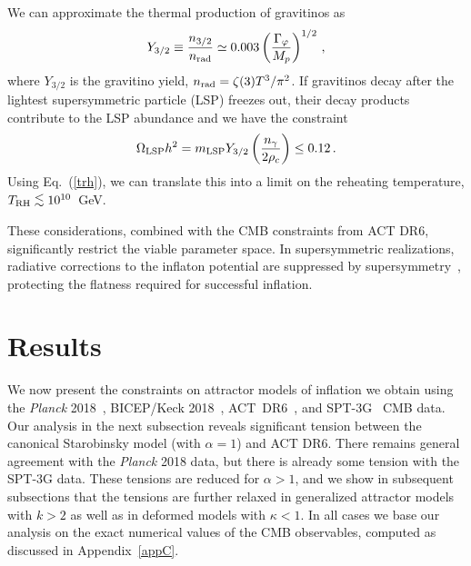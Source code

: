 \documentclass[aps,prev,twocolumn,preprintnumbers,floatfix,nofootinbib]{revtex4-1}
\newcommand{\beq}{\begin{equation}}
\newcommand{\eeq}{\end{equation}}
\newcommand{\la}{\lower.7ex\hbox{$\;\stackrel{\textstyle<}{\sim}\;$}}
\newcommand{\trh}{T_{\rm RH}}
\begin{document}
We can approximate the thermal production of gravitinos as ~\cite{ekn,enor,bbb,Pradler:2006qh,rst,Ellis:2015jpg,Ellis:2021kad,Eberl:2020fml,Eberl:2024pxr}
\begin{equation}
\label{gravitinoprodn}
Y_{3/2} \equiv \frac{n_{3/2}}{n_{\rm rad}} \simeq 0.003 \left(\frac{\Gamma_{\varphi}}{M_{p}}\right)^{1 / 2} \,,
\end{equation}
where $Y_{3/2}$ is the gravitino yield, $n_{\rm rad} = \zeta(3) T^3/\pi^2$.
If gravitinos decay after the lightest supersymmetric particle (LSP) freezes out, their decay products contribute to the LSP abundance
and we have the constraint
\beq
\Omega_{\mathrm{LSP}}h^2 = m_{\rm LSP} Y_{3/2} \left(\frac{n_\gamma}{2 \rho_c} \right)\leq 0.12 \, .
\eeq
Using Eq.~(\ref{trh}), we can translate this into a limit on the reheating temperature, $\trh \la 10^{10}$~GeV. 


These considerations, combined with the CMB constraints from ACT DR6, significantly restrict the viable parameter space. In supersymmetric realizations, radiative corrections to the inflaton potential are suppressed by supersymmetry~\cite{ENOT,DreesXu,egkko}, protecting the flatness required for successful inflation.



\section{Results}
\label{sec:results}
We now present the constraints on attractor models of inflation we obtain using the {\it Planck} 2018~\cite{Planck}, BICEP/Keck 2018~\cite{BICEP2021}, ACT~DR6~\cite{ACT:2025fju}, and SPT-3G~\cite{SPT-3G:2025bzu} CMB data. Our analysis in the next subsection reveals significant tension between the canonical Starobinsky model (with $\alpha = 1$) and ACT DR6. There remains general agreement with the {\it Planck} 2018 data, but there is already some tension with the SPT-3G data. These tensions are reduced for $\alpha > 1$, and we show in subsequent subsections that the tensions are further relaxed in generalized attractor models with $k > 2$ as well as in deformed models with $\kappa < 1$. In all cases we base our analysis on the exact numerical values of the CMB observables, computed as discussed in Appendix~\ref{appC}.

\end{document}
